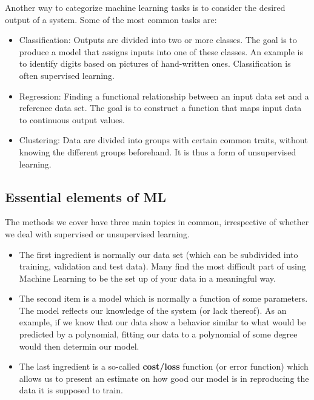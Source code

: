 \documentclass[%
oneside,                 %
final,                   %
10pt]{article}
\begin{document}
Another way to categorize machine learning tasks is to consider the
desired output of a system.  Some of the most common tasks are:

\begin{itemize}
\item Classification: Outputs are divided into two or more classes. The goal is to   produce a model that assigns inputs into one of these classes. An example is to identify  digits based on pictures of hand-written ones. Classification is often supervised learning.

\item Regression: Finding a functional relationship between an input data set and a reference data set.   The goal is to construct a function that maps input data to continuous output values.

\item Clustering: Data are divided into groups with certain common traits, without knowing the different groups beforehand.  It is thus a form of unsupervised learning.
\end{itemize}

\noindent



\subsection*{Essential elements of ML}

The methods we cover have three main topics in common, irrespective of
whether we deal with supervised or unsupervised learning.
\begin{itemize}
\item The first ingredient is normally our data set (which can be subdivided into training, validation  and test data). Many find the most difficult part of using Machine Learning to be the set up of your data in a meaningful way. 

\item The second item is a model which is normally a function of some parameters.  The model reflects our knowledge of the system (or lack thereof). As an example, if we know that our data show a behavior similar to what would be predicted by a polynomial, fitting our data to a polynomial of some degree would then determin our model. 

\item The last ingredient is a so-called \textbf{cost/loss} function (or error function) which allows us to present an estimate on how good our model is in reproducing the data it is supposed to train.  
\end{itemize}
\end{document}

